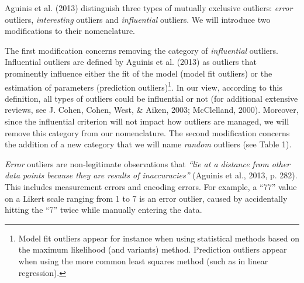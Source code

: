 \documentclass[man,floatsintext]{apa6}
\let\rmarkdownfootnote\footnote%
\def\footnote{\protect\rmarkdownfootnote}
\begin{document}
Aguinis et al. (2013) distinguish three types of mutually exclusive
outliers: \emph{error} outliers, \emph{interesting} outliers and
\emph{influential} outliers. We will introduce two modifications to
their nomenclature.

The first modification concerns removing the category of
\emph{influential} outliers. Influential outliers are defined by Aguinis
et al. (2013) as outliers that prominently influence either the fit of
the model (model fit outliers) or the estimation of parameters
(prediction
outliers)\footnote{Model fit outliers appear for instance when using statistical methods based on the maximum likelihood (and variants) method. Prediction outliers appear when using the more common least squares method (such as in linear regression).}.
In our view, according to this definition, all types of outliers could
be influential or not (for additional extensive reviews, see J. Cohen,
Cohen, West, \& Aiken, 2003; McClelland, 2000). Moreover, since the
influential criterion will not impact how outliers are managed, we will
remove this category from our nomenclature. The second modification
concerns the addition of a new category that we will name \emph{random}
outliers (see Table 1).

\emph{Error} outliers are non-legitimate observations that
\emph{\enquote{lie at a distance from other data points because they are
results of inaccuracies}} (Aguinis et al., 2013, p. 282). This includes
measurement errors and encoding errors. For example, a \enquote{77}
value on a Likert scale ranging from 1 to 7 is an error outlier, caused
by accidentally hitting the \enquote{7} twice while manually entering
the data.
\end{document}
